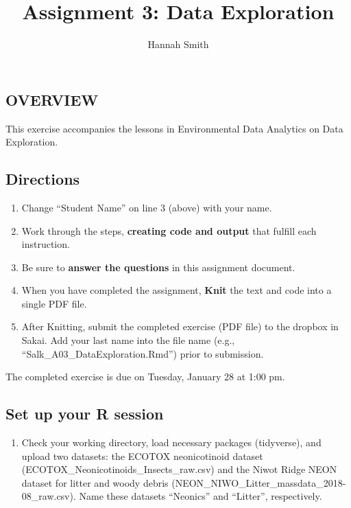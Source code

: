 \documentclass[]{article}
\title{Assignment 3: Data Exploration}
\author{Hannah Smith}
\date{}
\providecommand{\tightlist}{%
  \setlength{\itemsep}{0pt}\setlength{\parskip}{0pt}}
\begin{document}
\maketitle

\hypertarget{overview}{%
\subsection{OVERVIEW}\label{overview}}

This exercise accompanies the lessons in Environmental Data Analytics on
Data Exploration.

\hypertarget{directions}{%
\subsection{Directions}\label{directions}}

\begin{enumerate}
\def\labelenumi{\arabic{enumi}.}
\tightlist
\item
  Change ``Student Name'' on line 3 (above) with your name.
\item
  Work through the steps, \textbf{creating code and output} that fulfill
  each instruction.
\item
  Be sure to \textbf{answer the questions} in this assignment document.
\item
  When you have completed the assignment, \textbf{Knit} the text and
  code into a single PDF file.
\item
  After Knitting, submit the completed exercise (PDF file) to the
  dropbox in Sakai. Add your last name into the file name (e.g.,
  ``Salk\_A03\_DataExploration.Rmd'') prior to submission.
\end{enumerate}

The completed exercise is due on Tuesday, January 28 at 1:00 pm.

\hypertarget{set-up-your-r-session}{%
\subsection{Set up your R session}\label{set-up-your-r-session}}

\begin{enumerate}
\def\labelenumi{\arabic{enumi}.}
\tightlist
\item
  Check your working directory, load necessary packages (tidyverse), and
  upload two datasets: the ECOTOX neonicotinoid dataset
  (ECOTOX\_Neonicotinoids\_Insects\_raw.csv) and the Niwot Ridge NEON
  dataset for litter and woody debris
  (NEON\_NIWO\_Litter\_massdata\_2018-08\_raw.csv). Name these datasets
  ``Neonics'' and ``Litter'', respectively.
\end{enumerate}
\end{document}
